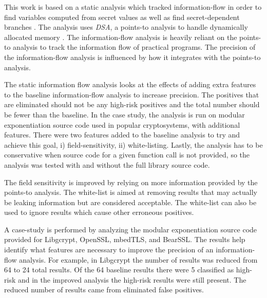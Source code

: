   This work is based on a static analysis which tracked information-flow in
  order to find variables computed from secret values as well as find
  secret-dependent branches \cite{moore2011static}. The analysis uses
  \textit{DSA}, a points-to analysis to handle dynamically allocated memory
  \cite{DSA-lattner}. The information-flow analysis is heavily reliant on the
  points-to analysis to track the information flow of practical programs. The
  precision of the information-flow analysis is influenced by how it integrates
  with the points-to analysis.
  
  The static information flow analysis looks at the effects of adding extra
  features to the baseline information-flow analysis to increase precision. The
  positives that are eliminated should not be any high-risk positives and the
  total number should be fewer than the baseline. In the case study, the
  analysis is run on modular exponentiation source code used in popular
  cryptosystems, with additional features. There were two features added to the
  baseline analysis to try and achieve this goal, i) field-sensitivity, ii)
  white-listing. Lastly, the analysis has to be conservative when source code
  for a given function call is not provided, so the analysis was tested with and
  without the full library source code.
  
  The field sensitivity is improved by relying on more information provided by
  the points-to analysis. The white-list is aimed at removing results that may
  actually be leaking information but are considered acceptable. The white-list
  can also be used to ignore results which cause other erroneous positives. 

  A case-study is performed by analyzing the modular exponentiation source code
  provided for Libgcrypt, OpenSSL, mbedTLS, and BearSSL. The results help
  identify what features are necessary to improve the precision of an
  information-flow analysis. For example, in Libgcrypt the number of results was
  reduced from 64 to 24 total results. Of the 64 baseline results there were 5
  classified as high-risk and in the improved analysis the high-risk results
  were still present. The reduced number of results came from eliminated false
  positives.


